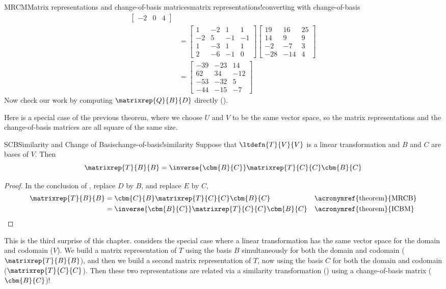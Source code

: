 \begin{example}{MRCM}{Matrix representations and change-of-basis matrices}{matrix representations!converting with change-of-basis}
\begin{align*}
\begin{bmatrix}
-2 & 0 & 4
\end{bmatrix}\\
%
&=
\begin{bmatrix}
 1 & -2 & 1 & 1 \\
 -2 & 5 & -1 & -1 \\
 1 & -3 & 1 & 1 \\
 2 & -6 & -1 & 0
\end{bmatrix}
%
\begin{bmatrix}
 19 & 16 & 25 \\
 14 & 9 & 9 \\
 -2 & -7 & 3 \\
 -28 & -14 & 4
\end{bmatrix}\\
%
&=
\begin{bmatrix}
 -39 & -23 & 14 \\
 62 & 34 & -12 \\
 -53 & -32 & 5 \\
 -44 & -15 & -7
\end{bmatrix}
%
\end{align*}
%
Now check our work by computing $\matrixrep{Q}{B}{D}$ directly ().
%
\end{example}
%
Here is a special case of the previous theorem, where we choose $U$ and $V$ to be the same vector space, so the matrix representations and the change-of-basis matrices are all square of the same size.
%
\begin{theorem}{SCB}{Similarity and Change of Basis}{change-of-basis!similarity}
Suppose that $\ltdefn{T}{V}{V}$ is a linear transformation and $B$ and $C$ are bases of $V$.  Then%
\begin{equation*}
\matrixrep{T}{B}{B}=\inverse{\cbm{B}{C}}\matrixrep{T}{C}{C}\cbm{B}{C}
\end{equation*}
%
\end{theorem}
%
\begin{proof}
In the conclusion of , replace $D$ by $B$, and replace $E$ by $C$, 
%
\begin{align*}
\matrixrep{T}{B}{B}
&=\cbm{C}{B}\matrixrep{T}{C}{C}\cbm{B}{C}&&\text{\acronymref{theorem}{MRCB}}\\
&=\inverse{\cbm{B}{C}}\matrixrep{T}{C}{C}\cbm{B}{C}&&\text{\acronymref{theorem}{ICBM}}
\end{align*}
%
\end{proof}
%
This is the third surprise of this chapter.   considers the special case where a linear transformation has the same vector space for the domain and codomain ($V$).  We build a matrix representation of $T$ using the basis $B$ simultaneously for both the domain and codomain ($\matrixrep{T}{B}{B}$), and then we build a second matrix representation of $T$, now using the basis $C$ for both the domain and codomain ($\matrixrep{T}{C}{C}$).  Then these two representations are related via a similarity transformation () using a change-of-basis matrix ($\cbm{B}{C}$)!\par

